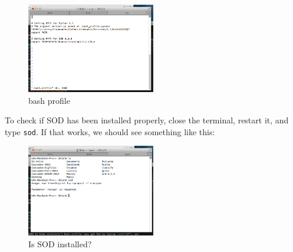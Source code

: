 \documentclass[letterpaper,10pt]{article}
\begin{document}
\begin{figure}[h!]
  \centering
  \includegraphics[width=0.5\textwidth]{images/home_bash_profile}
  \caption{bash profile}
  \label{fig:home_bash_profile}
\end{figure}

To check if SOD has been installed properly, close the terminal, restart it, and type \verb"sod". If that works, we should see something like this: 

\begin{figure}[h!]
  \centering
  \includegraphics[width=0.5\textwidth]{images/sod_installed_query}
  \caption{Is SOD installed?}
  \label{fig:sod_installed_query}
\end{figure}




\end{document}
